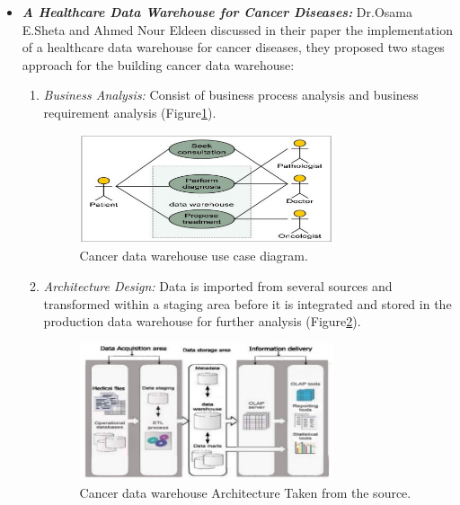 \begin{itemize}
  \item \textbf{\textit{A Healthcare Data Warehouse for Cancer Diseases:}} Dr.Osama E.Sheta and Ahmed Nour Eldeen discussed in their paper\cite{shetaBuildingHealthCare2012} the implementation of a healthcare data warehouse for cancer diseases, they proposed  two stages approach for the building cancer data warehouse: 
  
  \begin{enumerate}
    \item \textit{Business Analysis:} Consist of business process analysis and business requirement analysis (Figure\ref{fig:cancerDiagrame}).
    \begin{figure}[h!]
      \center
      \includegraphics[width=0.75\textwidth]{images/chapter3/cancerDiagrame.PNG}
      \caption{Cancer data warehouse use case diagram.}
      \label{fig:cancerDiagrame}
    \end{figure}
    \item \textit{Architecture Design:} Data is imported from several sources and transformed within a staging area before it is integrated and stored in the production data warehouse for further analysis (Figure\ref{fig:cancersystem}).
     \begin{figure}[h!]
      \center
      \includegraphics[width=0.75\textwidth]{images/chapter3/cancersystem.PNG}
      \caption{Cancer data warehouse Architecture Taken from the source.}
      \label{fig:cancersystem}
    \end{figure}
    \end{enumerate}
    

\end{itemize}
